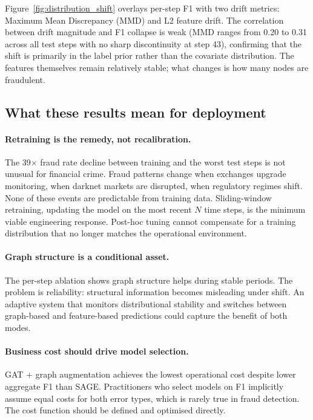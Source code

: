 Figure~\ref{fig:distribution_shift} overlays per-step F1 with two
drift metrics: Maximum Mean Discrepancy (MMD) and L2 feature drift.
The correlation between drift magnitude and F1 collapse is weak (MMD
ranges from 0.20 to 0.31 across all test steps with no sharp
discontinuity at step 43), confirming that the shift is primarily in
the label prior rather than the covariate distribution.  The features
themselves remain relatively stable; what changes is how many nodes
are fraudulent.

\subsection{What these results mean for deployment}

\paragraph{Retraining is the remedy, not recalibration.}
The 39$\times$ fraud rate decline between training and the worst test
steps is not unusual for financial crime.  Fraud patterns change when
exchanges upgrade monitoring, when darknet markets are disrupted, when
regulatory regimes shift.  None of these events are predictable from
training data.  Sliding-window retraining, updating the model on the
most recent $N$ time steps, is the minimum viable engineering response.
Post-hoc tuning cannot compensate for a training distribution that no
longer matches the operational environment.

\paragraph{Graph structure is a conditional asset.}
The per-step ablation shows graph structure helps during stable periods.
The problem is reliability: structural information becomes misleading
under shift.  An adaptive system that monitors distributional stability
and switches between graph-based and feature-based predictions could
capture the benefit of both modes.

\paragraph{Business cost should drive model selection.}
GAT + graph augmentation achieves the lowest operational cost despite
lower aggregate F1 than SAGE.  Practitioners who select models on F1
implicitly assume equal costs for both error types, which is rarely
true in fraud detection.  The cost function should be defined and
optimised directly.

